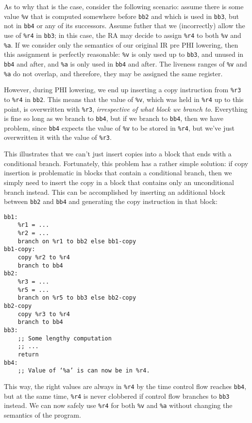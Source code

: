 \documentclass[12pt]{report}
\begin{document}
As to why that is the case, consider the following scenario: assume there is some value \verb|%v| that is computed somewhere before 
\verb|bb2| and which is used in \verb|bb3|, but not in \verb|bb4| or any of its successors. Assume futher that we (incorrectly) allow 
the use of \verb|%r4| in \verb|bb3|; in this case, the RA may decide to assign \verb|%r4| to both \verb|%v| and \verb|%a|. If we consider 
only the semantics of our original IR pre PHI lowering, then this assignment is perfectly reasonable: \verb|%v| is only used up to 
\verb|bb3|, and unused in \verb|bb4| and after, and \verb|%a| is only used in \verb|bb4| and after. The liveness ranges of \verb|%v| and 
\verb|%a| do not overlap, and therefore, they may be assigned the same register.

However, during PHI lowering, we end up inserting a copy instruction from \verb|%r3| to \verb|%r4| in \verb|bb2|. This means that the value
of \verb|%v|, which was held in \verb|%r4| up to this point, is overwritten with \verb|%r3|, \textit{irrespective of what block we branch 
to}. Everything is fine so long as we branch to \verb|bb4|, but if we branch to \verb|bb4|, then we have problem, since \verb|bb4|
expects the value of \verb|%v| to be stored in \verb|%r4|, but we've just overwritten it with the value of \verb|%r3|.

This illustrates that we can't just insert copies into a block that ends with a conditional branch. Fortunately, this problem has a rather
simple solution: if copy insertion is problematic in blocks that contain a conditional branch, then we simply need to insert the copy in a
block that contains only an unconditional branch instead. This can be accomplished by inserting an additional block between \verb|bb2| and
\verb|bb4| and generating the copy instruction in that block:
\begin{Verbatim}
bb1:
    %r1 = ...
    %r2 = ...
    branch on %r1 to bb2 else bb1-copy
bb1-copy:
    copy %r2 to %r4
    branch to bb4
bb2:
    %r3 = ...
    %r5 = ...
    branch on %r5 to bb3 else bb2-copy
bb2-copy
    copy %r3 to %r4
    branch to bb4
bb3:
    ;; Some lengthy computation
    ;; ...
    return
bb4:
    ;; Value of ‘%a’ is can now be in %r4.
\end{Verbatim}

\noindent This way, the right values are always in \verb|%r4| by the time control flow reaches \verb|bb4|, but at the same time, \verb|%r4|
is never clobbered if control flow branches to \verb|bb3| instead. We can now safely use \verb|%r4| for both \verb|%v| and \verb|%a| without
changing the semantics of the program.
\end{document}
